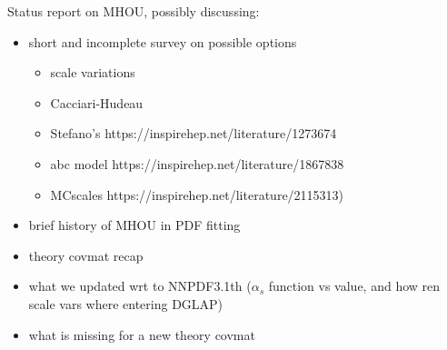 
Status report on MHOU, possibly discussing:
\begin{itemize}
	\item short and incomplete survey on possible options
	\begin{itemize}
		\item scale variations
		\item Cacciari-Hudeau
		\item  Stefano's https://inspirehep.net/literature/1273674
		\item abc model https://inspirehep.net/literature/1867838
		\item MCscales https://inspirehep.net/literature/2115313)
	\end{itemize} 
	\item brief history of MHOU in PDF fitting
	\item theory covmat recap
	\item what we updated wrt to NNPDF3.1th ($\alpha_s$ function vs value, and
		how ren scale vars where entering DGLAP)
	\item what is missing for a new theory covmat
\end{itemize}


